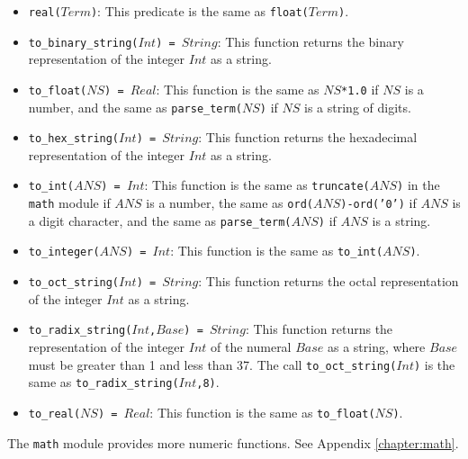 \begin{itemize}
\item \texttt{real($Term$)}: This predicate is the same as \texttt{float($Term$)}.
\item \texttt{to\_binary\_string($Int$) = $String$}: This function returns the binary representation of the integer $Int$ as a string.
\item \texttt{to\_float($NS$) = $Real$}: This function is the same as \texttt{$NS$*1.0} if $NS$ is a number, and the same as \texttt{parse\_term($NS$)} if $NS$ is a string of digits.
\item \texttt{to\_hex\_string($Int$) = $String$}: This function returns the hexadecimal representation of the integer $Int$ as a string.
\item \texttt{to\_int($ANS$) = $Int$}: This function is the same as \texttt{truncate($ANS$)} in the \texttt{math} module if $ANS$ is a number, the same as \texttt{ord($ANS$)-ord('0')} if $ANS$ is a digit character, and the same as \texttt{parse\_term($ANS$)} if $ANS$ is a string.
\item \texttt{to\_integer($ANS$) = $Int$}: This function is the same as \texttt{to\_int($ANS$)}.
\item \texttt{to\_oct\_string($Int$) = $String$}:  This function returns the octal representation of the integer $Int$ as a string.
\item \texttt{to\_radix\_string($Int$,$Base$) = $String$}:  This function returns the representation of the integer $Int$ of the numeral $Base$ as a string, where $Base$ must be greater than 1 and less than 37. The call \texttt{to\_oct\_string($Int$)} is the same as \texttt{to\_radix\_string($Int$,8)}.
\item \texttt{to\_real($NS$) = $Real$}: This function is the same as \texttt{to\_float($NS$)}.
\end{itemize}
The \texttt{math} module provides more numeric functions.  See Appendix \ref{chapter:math}.

